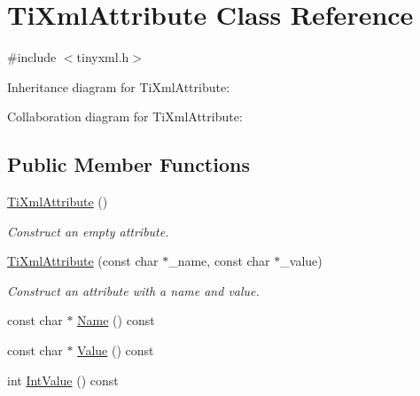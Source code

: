 \hypertarget{class_ti_xml_attribute}{
\section{\-Ti\-Xml\-Attribute \-Class \-Reference}
\label{class_ti_xml_attribute}
}


{\ttfamily \#include $<$tinyxml.\-h$>$}



\-Inheritance diagram for \-Ti\-Xml\-Attribute\-:


\-Collaboration diagram for \-Ti\-Xml\-Attribute\-:
\subsection*{\-Public \-Member \-Functions}
\begin{DoxyCompactItemize}
\item 
\hypertarget{class_ti_xml_attribute_a9cfa3c8179873fd485d83003b114f8e1}{
\hyperlink{class_ti_xml_attribute_a9cfa3c8179873fd485d83003b114f8e1}{\-Ti\-Xml\-Attribute} ()}
\label{class_ti_xml_attribute_a9cfa3c8179873fd485d83003b114f8e1}

\begin{DoxyCompactList}\small\item\em \-Construct an empty attribute. \end{DoxyCompactList}\item 
\hypertarget{class_ti_xml_attribute_a759d0b76fb8fcf765ecab243bc14f05e}{
\hyperlink{class_ti_xml_attribute_a759d0b76fb8fcf765ecab243bc14f05e}{\-Ti\-Xml\-Attribute} (const char $\ast$\-\_\-name, const char $\ast$\-\_\-value)}
\label{class_ti_xml_attribute_a759d0b76fb8fcf765ecab243bc14f05e}

\begin{DoxyCompactList}\small\item\em \-Construct an attribute with a name and value. \end{DoxyCompactList}\item 
const char $\ast$ \hyperlink{class_ti_xml_attribute_a298a57287d305904ba6bd96ae6f78d3d}{\-Name} () const 
\item 
const char $\ast$ \hyperlink{class_ti_xml_attribute_a0f874490eac8ca00ee0070765d0e97e3}{\-Value} () const 
\item 
\hypertarget{class_ti_xml_attribute_aa1a20ad59dc7e89a0ab265396360d50f}{
int \hyperlink{class_ti_xml_attribute_aa1a20ad59dc7e89a0ab265396360d50f}{\-Int\-Value} () const }
\label{class_ti_xml_attribute_aa1a20ad59dc7e89a0ab265396360d50f}


\end{DoxyCompactItemize}
